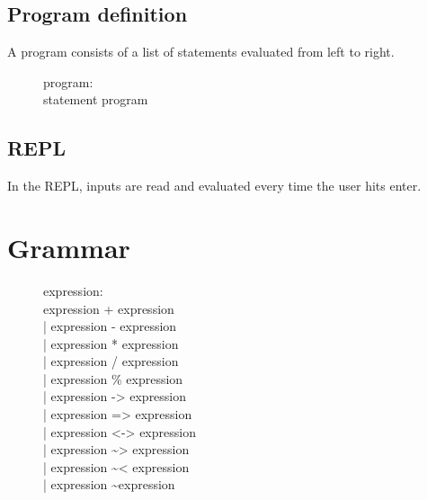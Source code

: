 \documentclass[12pt]{article}
\begin{document}

\subsection{Program definition}
A program consists of a list of statements evaluated from left to right.\\
\begin{description}
  \item[]program: \hfill \\
    statement program
\end{description}

\subsection{REPL}
In the REPL, inputs are read and evaluated every time the user hits enter.\\

\section{Grammar}
\begin{description}
  \item[]expression: \hfill \\
    expression + expression \\
    | expression - expression \\
    | expression * expression \\
    | expression / expression \\
    | expression \% expression \\
    | expression -> expression \\
    | expression => expression \\
    | expression <-> expression \\
    | expression \textasciitilde> expression \\
    | expression \textasciitilde< expression \\
    | expression \textasciitilde expression \\
\end{description}
\end{document}
